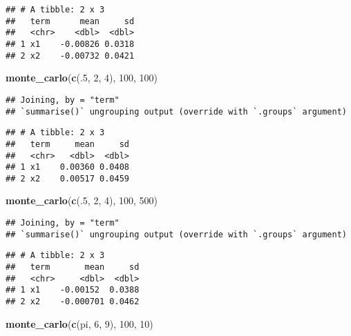 \documentclass[
]{article}
\newenvironment{Shaded}{\begin{snugshade}}{\end{snugshade}}
\newcommand{\DecValTok}[1]{\textcolor[rgb]{0.00,0.00,0.81}{#1}}
\newcommand{\KeywordTok}[1]{\textcolor[rgb]{0.13,0.29,0.53}{\textbf{#1}}}
\newcommand{\NormalTok}[1]{#1}
\begin{document}
\begin{verbatim}
## # A tibble: 2 x 3
##   term      mean     sd
##   <chr>    <dbl>  <dbl>
## 1 x1    -0.00826 0.0318
## 2 x2    -0.00732 0.0421
\end{verbatim}

\begin{Shaded}
\begin{Highlighting}[]
\KeywordTok{monte\_carlo}\NormalTok{(}\KeywordTok{c}\NormalTok{(.}\DecValTok{5}\NormalTok{, }\DecValTok{2}\NormalTok{, }\DecValTok{4}\NormalTok{), }\DecValTok{100}\NormalTok{, }\DecValTok{100}\NormalTok{)}
\end{Highlighting}
\end{Shaded}

\begin{verbatim}
## Joining, by = "term"
## `summarise()` ungrouping output (override with `.groups` argument)
\end{verbatim}

\begin{verbatim}
## # A tibble: 2 x 3
##   term     mean     sd
##   <chr>   <dbl>  <dbl>
## 1 x1    0.00360 0.0408
## 2 x2    0.00517 0.0459
\end{verbatim}

\begin{Shaded}
\begin{Highlighting}[]
\KeywordTok{monte\_carlo}\NormalTok{(}\KeywordTok{c}\NormalTok{(.}\DecValTok{5}\NormalTok{, }\DecValTok{2}\NormalTok{, }\DecValTok{4}\NormalTok{), }\DecValTok{100}\NormalTok{, }\DecValTok{500}\NormalTok{)}
\end{Highlighting}
\end{Shaded}

\begin{verbatim}
## Joining, by = "term"
## `summarise()` ungrouping output (override with `.groups` argument)
\end{verbatim}

\begin{verbatim}
## # A tibble: 2 x 3
##   term       mean     sd
##   <chr>     <dbl>  <dbl>
## 1 x1    -0.00152  0.0388
## 2 x2    -0.000701 0.0462
\end{verbatim}

\begin{Shaded}
\begin{Highlighting}[]
\KeywordTok{monte\_carlo}\NormalTok{(}\KeywordTok{c}\NormalTok{(pi, }\DecValTok{6}\NormalTok{, }\DecValTok{9}\NormalTok{), }\DecValTok{100}\NormalTok{, }\DecValTok{10}\NormalTok{)}
\end{Highlighting}
\end{Shaded}
\end{document}
